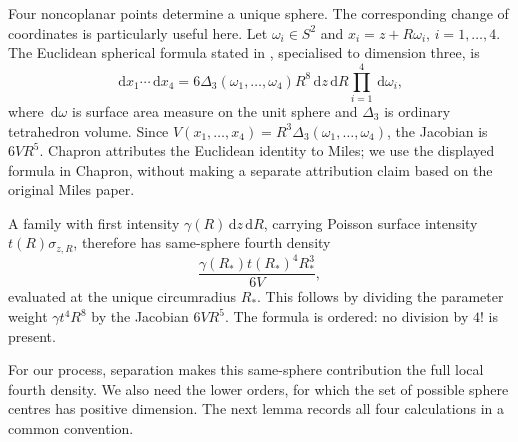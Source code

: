 \documentclass[11pt,a4paper]{article}
\numberwithin{equation}{section}
\theoremstyle{definition}
\theoremstyle{remark}
\newcommand{\dd}{\,\mathrm d}
\begin{document}
Four noncoplanar points determine a unique sphere. The corresponding
change of coordinates is particularly useful here. Let $\omega_i\in S^2$
and $x_i=z+R\omega_i$, $i=1,\ldots,4$. The Euclidean spherical formula
stated in \cite[equation (1)]{Chapron2018}, specialised to dimension three,
is
\begin{equation}
 \dd x_1\cdots\dd x_4
 =6\Delta_3(\omega_1,\ldots,\omega_4)R^8
       \dd z\dd R\prod_{i=1}^4\dd\omega_i,
 \label{eq:chapron}
\end{equation}
where $\dd\omega$ is surface area measure on the unit sphere and
$\Delta_3$ is ordinary tetrahedron volume. Since
$V(x_1,\ldots,x_4)=R^3\Delta_3(\omega_1,\ldots,\omega_4)$, the Jacobian
is $6VR^5$. Chapron attributes the Euclidean identity to Miles; we use
the displayed formula in Chapron, without making a separate attribution
claim based on the original Miles paper.

A family with first intensity $\gamma(R)\dd z\dd R$, carrying Poisson
surface intensity $t(R)\sigma_{z,R}$, therefore has same-sphere fourth
density
\begin{equation}
 \frac{\gamma(R_*)t(R_*)^4R_*^3}{6V},
 \label{eq:generic-fourth}
\end{equation}
evaluated at the unique circumradius $R_*$. This follows by dividing
the parameter weight $\gamma t^4R^8$ by the Jacobian $6VR^5$.
The formula is ordered: no division by $4!$ is present.

For our process, separation makes this same-sphere contribution the full
local fourth density. We also need the lower orders, for which the set of
possible sphere centres has positive dimension. The next lemma records
all four calculations in a common convention.
\end{document}
